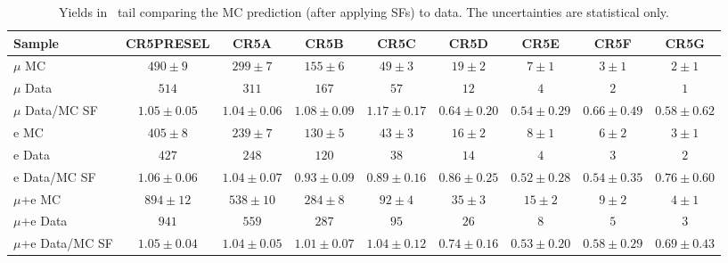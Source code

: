 \begin{table}[!h]
\begin{center}
{\footnotesize
\begin{tabular}{l||c||c|c|c|c|c|c|c}
\hline
Sample              & CR5PRESEL & CR5A & CR5B & CR5C & CR5D & CR5E &
CR5F & CR5G \\
\hline
\hline
$\mu$ MC 		  & $490 \pm 9$ & $299 \pm 7$ & $155 \pm 6$ & $49 \pm 3$ & $19 \pm 2$ & $7 \pm 1$ & $3 \pm 1$ & $2 \pm 1$ \\
$\mu$ Data 		  & $514$ & $311$ & $167$ & $57$ & $12$ & $4$ & $2$ & $1$ \\
\hline
$\mu$ Data/MC SF 	  & $1.05 \pm 0.05$ & $1.04 \pm 0.06$ & $1.08 \pm 0.09$ & $1.17 \pm 0.17$ & $0.64 \pm 0.20$ & $0.54 \pm 0.29$ & $0.66 \pm 0.49$ & $0.58 \pm 0.62$ \\
\hline
\hline
e MC 		  & $405 \pm 8$ & $239 \pm 7$ & $130 \pm 5$ & $43 \pm 3$ & $16 \pm 2$ & $8 \pm 1$ & $6 \pm 2$ & $3 \pm 1$ \\
e Data 		  & $427$ & $248$ & $120$ & $38$ & $14$ & $4$ & $3$ & $2$ \\
\hline
e Data/MC SF 	  & $1.06 \pm 0.06$ & $1.04 \pm 0.07$ & $0.93 \pm 0.09$ & $0.89 \pm 0.16$ & $0.86 \pm 0.25$ & $0.52 \pm 0.28$ & $0.54 \pm 0.35$ & $0.76 \pm 0.60$ \\
\hline
\hline
$\mu$+e MC 		  & $894 \pm 12$ & $538 \pm 10$ & $284 \pm 8$ & $92 \pm 4$ & $35 \pm 3$ & $15 \pm 2$ & $9 \pm 2$ & $4 \pm 1$ \\
$\mu$+e Data 		  & $941$ & $559$ & $287$ & $95$ & $26$ & $8$ & $5$ & $3$ \\
\hline
$\mu$+e Data/MC SF 		  & $1.05 \pm 0.04$ & $1.04 \pm 0.05$ & $1.01 \pm 0.07$ & $1.04 \pm 0.12$ & $0.74 \pm 0.16$ & $0.53 \pm 0.20$ & $0.58 \pm 0.29$ & $0.69 \pm 0.43$ \\
\hline
\end{tabular}}
\caption{ Yields in \mt\ tail comparing the MC prediction (after
  applying SFs) to data. The uncertainties are statistical only.
\label{tab:cr5yields}}
\end{center}
\end{table}

